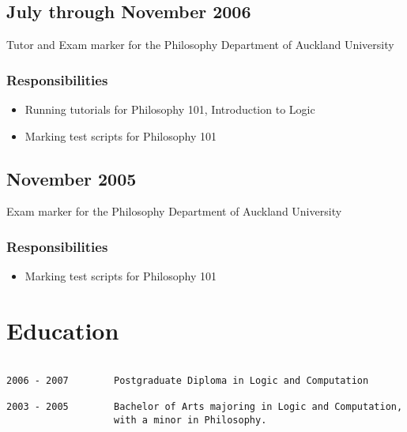 \documentclass[10pt,oneside]{memoir}
\begin{document}
\subsection*{July through November 2006}
\label{julythroughnovember2006}

Tutor and Exam marker for the Philosophy Department of Auckland University


\subsubsection*{Responsibilities}
\label{responsibilities}

\begin{itemize}


\item Running tutorials for Philosophy 101, Introduction to Logic

\item Marking test scripts for Philosophy 101
\end{itemize}

\subsection*{November 2005}
\label{november2005}

Exam marker for the Philosophy Department of Auckland University


\subsubsection*{Responsibilities}
\label{responsibilities}

\begin{itemize}


\item Marking test scripts for Philosophy 101
\end{itemize}


{}
\section*{Education}
\label{education}

\begin{adjustwidth}{2.5em}{2.5em}
\begin{verbatim}

2006 - 2007        Postgraduate Diploma in Logic and Computation

2003 - 2005        Bachelor of Arts majoring in Logic and Computation,
                   with a minor in Philosophy.

\end{verbatim}
\end{adjustwidth}
\end{document}

